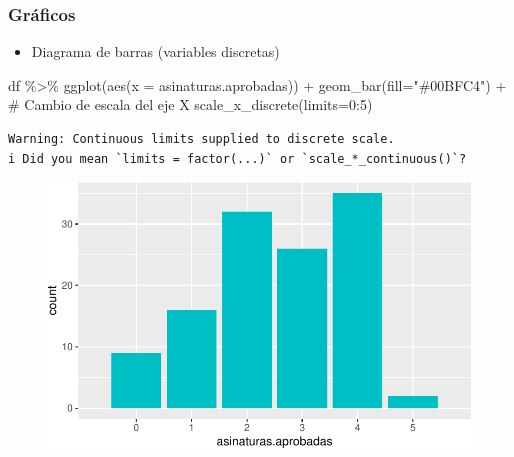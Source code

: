 \documentclass[
  a4paper,
]{scrreport}
\newenvironment{Shaded}{\begin{snugshade}}{\end{snugshade}}
\newcommand{\AttributeTok}[1]{\textcolor[rgb]{0.40,0.45,0.13}{#1}}
\newcommand{\CommentTok}[1]{\textcolor[rgb]{0.37,0.37,0.37}{#1}}
\newcommand{\DecValTok}[1]{\textcolor[rgb]{0.68,0.00,0.00}{#1}}
\newcommand{\FunctionTok}[1]{\textcolor[rgb]{0.28,0.35,0.67}{#1}}
\newcommand{\NormalTok}[1]{\textcolor[rgb]{0.00,0.23,0.31}{#1}}
\newcommand{\SpecialCharTok}[1]{\textcolor[rgb]{0.37,0.37,0.37}{#1}}
\newcommand{\StringTok}[1]{\textcolor[rgb]{0.13,0.47,0.30}{#1}}
\providecommand{\tightlist}{%
  \setlength{\itemsep}{0pt}\setlength{\parskip}{0pt}}\usepackage{longtable,booktabs,array}
\theoremstyle{definition}
\theoremstyle{definition}
\theoremstyle{remark}
\begin{document}
\hypertarget{gruxe1ficos}{%
\subsubsection{Gráficos}\label{gruxe1ficos}}

\begin{itemize}
\tightlist
\item
  Diagrama de barras (variables discretas)
\end{itemize}

\begin{Shaded}
\begin{Highlighting}[]
\NormalTok{df }\SpecialCharTok{\%\textgreater{}\%} \FunctionTok{ggplot}\NormalTok{(}\FunctionTok{aes}\NormalTok{(}\AttributeTok{x =}\NormalTok{ asinaturas.aprobadas)) }\SpecialCharTok{+} 
  \FunctionTok{geom\_bar}\NormalTok{(}\AttributeTok{fill=}\StringTok{"\#00BFC4"}\NormalTok{) }\SpecialCharTok{+} 
  \CommentTok{\# Cambio de escala del eje X}
  \FunctionTok{scale\_x\_discrete}\NormalTok{(}\AttributeTok{limits=}\DecValTok{0}\SpecialCharTok{:}\DecValTok{5}\NormalTok{) }
\end{Highlighting}
\end{Shaded}

\begin{verbatim}
Warning: Continuous limits supplied to discrete scale.
i Did you mean `limits = factor(...)` or `scale_*_continuous()`?
\end{verbatim}

\begin{figure}[H]

{\centering \includegraphics{./08-analisis-estadisticos_files/figure-pdf/unnamed-chunk-10-1.pdf}

}

\end{figure}
\end{document}
